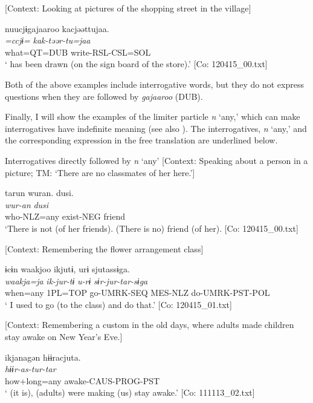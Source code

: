  \ex \label{ex:5:b} [Context: Looking at pictures of the shopping street in the village]

\glll  nuucjɨgajaaroo  kacjəəttujaa.\\
\textit{=ccjɨ=}  \textit{kak-təər-tu=jaa}\\
what=QT=DUB  write-RSL-CSL=SOL\\
\glt ‘ has been drawn (on the sign board of the store).’ [Co: 120415\_00.txt]
\z
\z

Both of the above examples include interrogative words, but they do not express questions when they are followed by \textit{gajaaroo} (DUB).

  Finally, I will show the examples of the limiter particle \textit{n} ‘any,’ which can make interrogatives have indefinite meaning (see also ). The interrogatives, \textit{n} ‘any,’ and the corresponding expression in the free translation are underlined below.

\ea \label{ex:5:41}   Interrogatives directly followed by \textit{n} ‘any’
 \ea \label{ex:5:41a} [Context: Speaking about a person in a picture; TM: ‘There are no classmates of her here.’]

\glll  tarun  wuran.  dusi.\\
\textit{}  \textit{wur-an}  \textit{dusi}\\
who-NLZ=any  exist-NEG  friend\\
\glt ‘There is not  (of her friends). (There is no) friend (of her). [Co: 120415\_00.txt]

 \ex \label{ex:5:b} [Context: Remembering the flower arrangement class]

\glll  ɨcɨn  waakjoo  ikjutɨ,  urɨ  sjutassɨga.\\
\textit{}  \textit{waakja=ja}  \textit{ik-jur-tɨ}  \textit{u-rɨ}  \textit{sɨr-jur-tar-sɨga}\\
when=any  1PL=TOP  go-UMRK-SEQ  MES-NLZ  do-UMRK-PST-POL\\
\glt ‘ I used to go (to the class) and do that.’ [Co: 120415\_01.txt]

 \ex \label{ex:5:c} [Context: Remembering a custom in the old days, where adults made children stay awake on New Year’s Eve.]

\glll  ikjanagən  hɨɨracjuta.\\
\textit{}  \textit{hɨɨr-as-tur-tar}\\
how+long=any  awake-CAUS-PROG-PST\\
\glt ‘ (it is), (adults) were making (us) stay awake.’ [Co: 111113\_02.txt]
\z
\z

